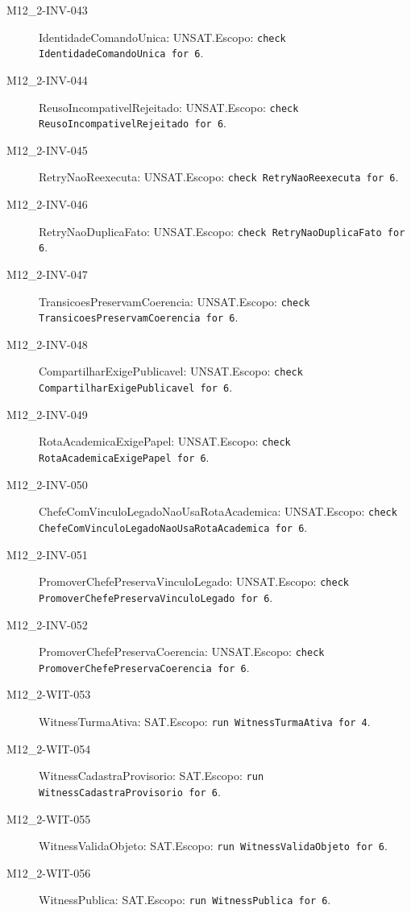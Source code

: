 \begin{description}
\item[M12\_2-INV-043] IdentidadeComandoUnica: UNSAT.\newline Escopo: \texttt{check IdentidadeComandoUnica for 6}.
\item[M12\_2-INV-044] ReusoIncompativelRejeitado: UNSAT.\newline Escopo: \texttt{check ReusoIncompativelRejeitado for 6}.
\item[M12\_2-INV-045] RetryNaoReexecuta: UNSAT.\newline Escopo: \texttt{check RetryNaoReexecuta for 6}.
\item[M12\_2-INV-046] RetryNaoDuplicaFato: UNSAT.\newline Escopo: \texttt{check RetryNaoDuplicaFato for 6}.
\item[M12\_2-INV-047] TransicoesPreservamCoerencia: UNSAT.\newline Escopo: \texttt{check TransicoesPreservamCoerencia for 6}.
\item[M12\_2-INV-048] CompartilharExigePublicavel: UNSAT.\newline Escopo: \texttt{check CompartilharExigePublicavel for 6}.
\item[M12\_2-INV-049] RotaAcademicaExigePapel: UNSAT.\newline Escopo: \texttt{check RotaAcademicaExigePapel for 6}.
\item[M12\_2-INV-050] ChefeComVinculoLegadoNaoUsaRotaAcademica: UNSAT.\newline Escopo: \texttt{check ChefeComVinculoLegadoNaoUsaRotaAcademica for 6}.
\item[M12\_2-INV-051] PromoverChefePreservaVinculoLegado: UNSAT.\newline Escopo: \texttt{check PromoverChefePreservaVinculoLegado for 6}.
\item[M12\_2-INV-052] PromoverChefePreservaCoerencia: UNSAT.\newline Escopo: \texttt{check PromoverChefePreservaCoerencia for 6}.
\item[M12\_2-WIT-053] WitnessTurmaAtiva: SAT.\newline Escopo: \texttt{run WitnessTurmaAtiva for 4}.
\item[M12\_2-WIT-054] WitnessCadastraProvisorio: SAT.\newline Escopo: \texttt{run WitnessCadastraProvisorio for 6}.
\item[M12\_2-WIT-055] WitnessValidaObjeto: SAT.\newline Escopo: \texttt{run WitnessValidaObjeto for 6}.
\item[M12\_2-WIT-056] WitnessPublica: SAT.\newline Escopo: \texttt{run WitnessPublica for 6}.

\end{description}
